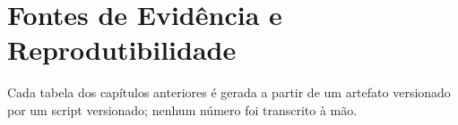 \chapter{Fontes de Evidência e Reprodutibilidade}
\label{apend:fontes}

Cada tabela dos capítulos anteriores é gerada a partir de um artefato versionado por um script versionado; nenhum número foi transcrito à mão.


